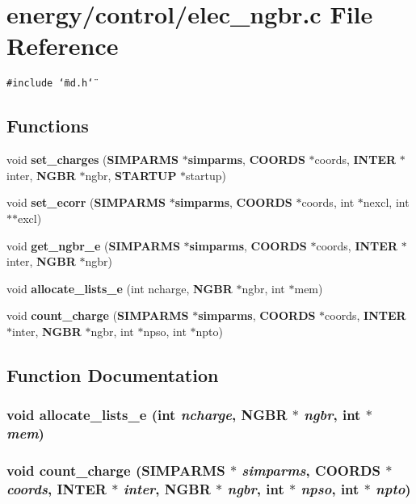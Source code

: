 \section{energy/control/elec\_\-ngbr.c File Reference}
\label{elec__ngbr_8c}
{\tt \#include \char`\"{}md.h\char`\"{}}\par
\subsection*{Functions}
\begin{CompactItemize}
\item 
void {\bf set\_\-charges} ({\bf SIMPARMS} $\ast${\bf simparms}, {\bf COORDS} $\ast$coords, {\bf INTER} $\ast$inter, {\bf NGBR} $\ast$ngbr, {\bf STARTUP} $\ast$startup)
\item 
void {\bf set\_\-ecorr} ({\bf SIMPARMS} $\ast${\bf simparms}, {\bf COORDS} $\ast$coords, int $\ast$nexcl, int $\ast$$\ast$excl)
\item 
void {\bf get\_\-ngbr\_\-e} ({\bf SIMPARMS} $\ast${\bf simparms}, {\bf COORDS} $\ast$coords, {\bf INTER} $\ast$inter, {\bf NGBR} $\ast$ngbr)
\item 
void {\bf allocate\_\-lists\_\-e} (int ncharge, {\bf NGBR} $\ast$ngbr, int $\ast$mem)
\item 
void {\bf count\_\-charge} ({\bf SIMPARMS} $\ast${\bf simparms}, {\bf COORDS} $\ast$coords, {\bf INTER} $\ast$inter, {\bf NGBR} $\ast$ngbr, int $\ast$npso, int $\ast$npto)
\end{CompactItemize}


\subsection{Function Documentation}
\subsubsection{\setlength{\rightskip}{0pt plus 5cm}void allocate\_\-lists\_\-e (int {\em ncharge}, {\bf NGBR} $\ast$ {\em ngbr}, int $\ast$ {\em mem})}\label{elec__ngbr_8c_2a68d9153c530324157efe4f8d300489}


\subsubsection{\setlength{\rightskip}{0pt plus 5cm}void count\_\-charge ({\bf SIMPARMS} $\ast$ {\em simparms}, {\bf COORDS} $\ast$ {\em coords}, {\bf INTER} $\ast$ {\em inter}, {\bf NGBR} $\ast$ {\em ngbr}, int $\ast$ {\em npso}, int $\ast$ {\em npto})}\label{elec__ngbr_8c_32ce09511a1e25d335128accb3434337}



